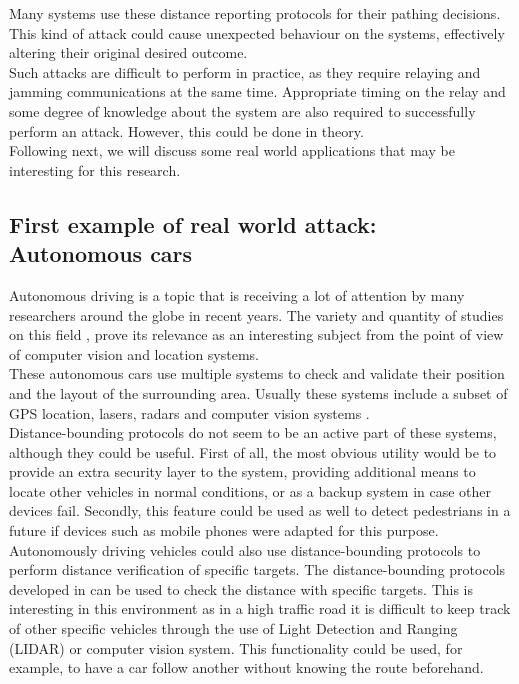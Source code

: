 \documentclass{article}
\begin{document}
Many systems use these distance reporting protocols for their pathing decisions. This kind of attack could cause unexpected behaviour on the systems, effectively altering their original desired outcome.\\

Such attacks are difficult to perform in practice, as they require relaying and jamming communications at the same time. Appropriate timing on the relay and some degree of knowledge about the system are also required to successfully perform an attack. However, this could be done in theory.\\

Following next, we will discuss some real world applications that may be interesting for this research.\\

\subsection{First example of real world attack: Autonomous cars}

Autonomous driving is a topic that is receiving a lot of attention by many researchers around the globe in recent years. The variety and quantity of studies on this field \cite{continentalautonomous, franke1999autonomous, geiger2012we, levinsontowards}, prove its relevance as an interesting subject from the point of view of computer vision and location systems.\\

These autonomous cars use multiple systems to check and validate their position and the layout of the surrounding area. Usually these systems include a subset of GPS location, lasers, radars and computer vision systems \cite{continentalautonomous,levinsontowards}.\\

Distance-bounding protocols do not seem to be an active part of these systems, although they could be useful. First of all, the most obvious utility would be to provide an extra security layer to the system, providing additional means to locate other vehicles in normal conditions, or as a backup system in case other devices fail. Secondly, this feature could be used as well to detect pedestrians in a future if devices such as mobile phones were adapted for this purpose.\\

Autonomously driving vehicles could also use distance-bounding protocols to perform distance verification of specific targets. The distance-bounding protocols developed in  \cite{capkun2006secure, rasmussen2010realization} can be used to check the distance with specific targets. This is interesting in this environment as in a high traffic road it is difficult to keep track of other specific vehicles through the use of Light Detection and Ranging (LIDAR) or computer vision system. This functionality could be used, for example, to have a car follow another without knowing the route beforehand.\\
\end{document}
